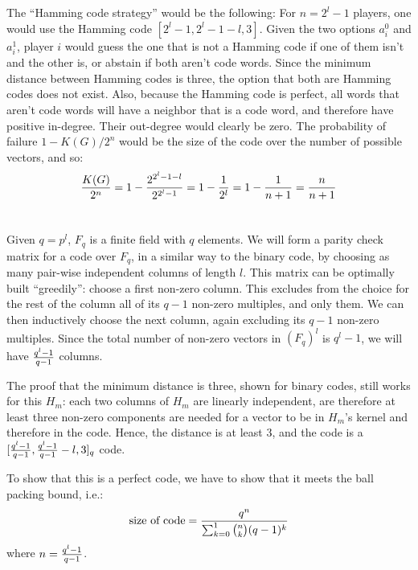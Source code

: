 \documentclass[11pt]{article} \usepackage{amssymb}
\begin{document}
\subsection{}
The ``Hamming code strategy'' would be the following: For $n=2^l-1$ players, 
one would use the Hamming code $[2^l-1, 2^l-1-l, 3]$.
Given the two
options $a_i^0$ and $a_i^1$, player $i$ would guess the one that is not a Hamming
code if one of them isn't and the other is, 
or abstain if both aren't code words. Since the minimum
distance between Hamming codes is three, the option that both are Hamming
codes does not exist. Also, because the Hamming code is perfect, all
words that aren't code words will have a neighbor that is a code word,
and therefore have positive in-degree. Their out-degree would clearly
be zero.
The probability of failure $1-K(G)/2^n$ would be the size of the code
over the number of possible vectors, and so: 
\begin{equation}
  {K(G)\over 2^n}=1-{2^{2^l-1-l}\over 2^{2^l-1}}=1-{1\over 2^l}=1-{1\over n+1}
  ={n\over n+1}
\end{equation}

\section{}
Given $q=p^l$, $F_q$ is a finite field with $q$ elements. We will form
a parity check matrix for a code over $F_q$, in a similar way to
the binary code, by choosing as many pair-wise independent columns
of length $l$. This matrix can be optimally built ``greedily'': choose
a first non-zero column. This excludes from the choice for the rest
of the column all of its $q-1$ non-zero multiples, and only them. We can
then inductively choose the next column, again excluding its $q-1$ 
non-zero multiples. Since the total number of non-zero vectors in $(F_q)^l$
is $q^l-1$, we will have ${q^l-1\over q-1}$ columns.

The proof that the minimum distance is three, shown for binary codes, still
works for this $H_m$: each two columns of $H_m$ are linearly independent,
are therefore at least three non-zero components are needed for a 
vector to be in $H_m$'s kernel and therefore in the code. Hence, the
distance is at least 3, and the code is a 
$[{q^l-1\over q-1},{q^l-1\over q-1}-l,3]_q$ code.

To show that this is a perfect code, we have to show that it meets the
ball packing bound, i.e.:
\begin{equation*}
  \textrm{size of code}={q^n\over \sum_{k=0}^1{{n \choose k}(q-1)^k}}
\end{equation*}
where $n={q^l-1\over q-1}$.
\end{document}
